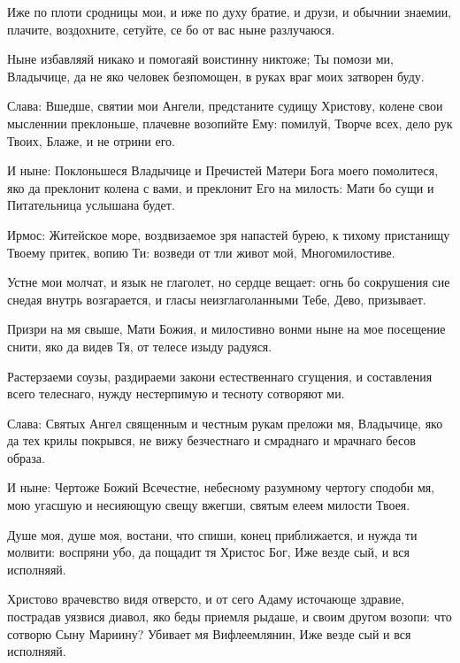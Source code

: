 \begin{mymulticols}
Иже по плоти сродницы мои, и иже по духу братие, и друзи, и обычнии знаемии, плачите, воздохните, сетуйте, се бо от вас ныне разлучаюся.


Ныне избавляяй никако и помогаяй воистинну никтоже; Ты помози ми, Владычице, да не яко человек безпомощен, в руках враг моих затворен буду.


Слава: Вшедше, святии мои Ангели, предстаните судищу Христову, колене свои мысленнии преклоньше, плачевне возопийте Ему: помилуй, Творче всех, дело рук Твоих, Блаже, и не отрини его.


И ныне: Поклоньшеся Владычице и Пречистей Матери Бога моего помолитеся, яко да преклонит колена с вами, и преклонит Его на милость: Мати бо сущи и Питательница услышана будет.




Ирмос: Житейское море, воздвизаемое зря напастей бурею, к тихому пристанищу Твоему притек, вопию Ти: возведи от тли живот мой, Многомилостиве.





Устне мои молчат, и язык не глаголет, но сердце вещает: огнь бо сокрушения сие снедая внутрь возгарается, и гласы неизглаголанными Тебе, Дево, призывает.


Призри на мя свыше, Мати Божия, и милостивно вонми ныне на мое посещение снити, яко да видев Тя, от телесе изыду радуяся.


Растерзаеми соузы, раздираеми закони естественнаго сгущения, и составления всего телеснаго, нужду нестерпимую и тесноту сотворяют ми.


Слава: Святых Ангел священным и честным рукам преложи мя, Владычице, яко да тех крилы покрывся, не вижу безчестнаго и смраднаго и мрачнаго бесов образа.


И ныне: Чертоже Божий Всечестне, небесному разумному чертогу сподоби мя, мою угасшую и несияющую свещу вжегши, святым елеем милости Твоея.




Душе моя, душе моя, востани, что спиши, конец приближается, и нужда ти молвити: воспряни убо, да пощадит тя Христос Бог, Иже везде сый, и вся исполняяй.




Христово врачевство видя отверсто, и от сего Адаму источающе здравие, пострадав уязвися диавол, яко беды приемля рыдаше, и своим другом возопи: что сотворю Сыну Мариину? Убивает мя Вифлеемлянин, Иже везде сый и вся исполняяй.



\end{mymulticols}
